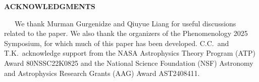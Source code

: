 \documentclass[prd,aps,psfig,nofootinbib,nobibnotes,superscriptaddress,preprintnumbers,times]{revtex4-2}\setlength{\topmargin}{-14mm}
\begin{document}
\begin{center}
    \textbf{ACKNOWLEDGMENTS}    
\end{center}
\ \ \ We thank Murman Gurgenidze and Qiuyue Liang for useful discussions related to the paper. We also thank the organizers of the Phenomenology 2025 Symposium, for which much of this paper has been developed. C.C.\ and T.K.\ acknowledge support from the NASA Astrophysics Theory Program (ATP) Award 80NSSC22K0825 and the National Science Foundation (NSF) Astronomy and Astrophysics Research Grants (AAG) Award AST2408411.




\clearpage
\end{document}
